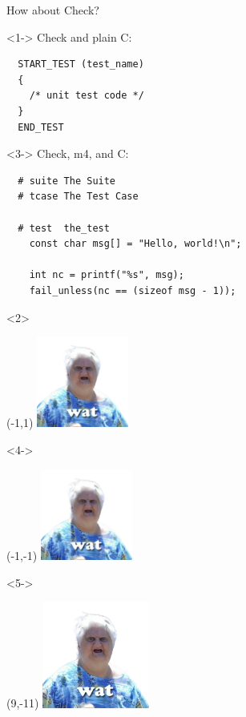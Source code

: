 \documentclass[10pt]{beamer}
\begin{document}

\begin{frame}[fragile]{How about Check?}

  \begin{onlyenv}<1->
  Check and plain C:
  \begin{lstlisting}
  START_TEST (test_name)
  {
    /* unit test code */
  }
  END_TEST
  \end{lstlisting}
  \end{onlyenv}

  \begin{onlyenv}<3->
  Check, m4, and C:
  \begin{lstlisting}
  # suite The Suite
  # tcase The Test Case

  # test  the_test
    const char msg[] = "Hello, world!\n";

    int nc = printf("%s", msg);
    fail_unless(nc == (sizeof msg - 1));
  \end{lstlisting}
  \end{onlyenv}

  \begin{onlyenv}<2>
  \begin{textblock}{3}(-1,1)
    \includegraphics[height=3cm]{wat.png}
  \end{textblock}
  \end{onlyenv}

  \begin{onlyenv}<4->
  \begin{textblock}{3}(-1,-1)
    \includegraphics[height=3cm]{wat.png}
  \end{textblock}
  \end{onlyenv}

  \begin{onlyenv}<5->
  \begin{textblock}{3}(9,-11)
    \includegraphics[angle=120,height=3.5cm]{wat.png}
  \end{textblock}
  \end{onlyenv}


\end{frame}
\end{document}
